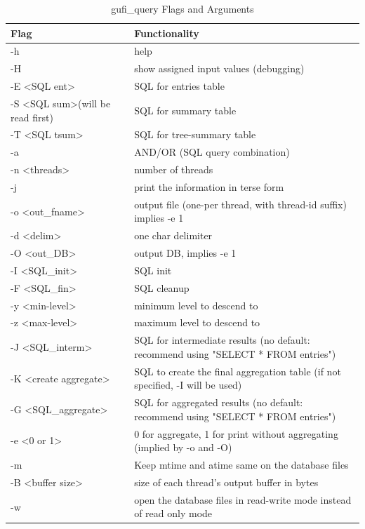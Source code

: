 \begin{table} [h]
\centering
\begin{tabular}{l|p{6cm}}
Flag & Functionality \\\hline
-h & help\\
\hline
-H & show assigned input values (debugging)\\
\hline
-E \textless SQL ent\textgreater & SQL for entries table \\
\hline
-S \textless SQL sum\textgreater (will be read first) & SQL for summary table\\
\hline
-T \textless SQL tsum\textgreater & SQL for tree-summary table\\
\hline
-a & AND/OR (SQL query combination)\\
\hline
-n \textless threads\textgreater & number of threads\\
\hline
-j & print the information in terse form\\
\hline
-o \textless out\_fname\textgreater & output file (one-per thread, with thread-id suffix) implies -e 1\\
\hline
-d \textless delim\textgreater & one char delimiter \\
\hline
-O \textless out\_DB\textgreater & output DB, implies -e 1 \\
\hline
-I \textless SQL\_init\textgreater & SQL init \\
\hline
-F \textless SQL\_fin\textgreater & SQL cleanup \\
\hline
-y \textless min-level\textgreater & minimum level to descend to \\
\hline
-z \textless max-level\textgreater & maximum level to descend to\\
\hline
-J \textless SQL\_interm\textgreater & SQL for intermediate results (no default: recommend using "SELECT * FROM entries") \\
\hline
-K \textless create aggregate\textgreater & SQL to create the final aggregation table (if not specified, -I will be used)\\
\hline
-G \textless SQL\_aggregate\textgreater & SQL for aggregated results (no default: recommend using "SELECT * FROM entries")\\
\hline
-e \textless 0 or 1\textgreater & 0 for aggregate, 1 for print without aggregating (implied by -o and -O)\\
\hline
-m & Keep mtime and atime same on the database files \\
\hline
-B \textless buffer size\textgreater & size of each thread's output buffer in bytes \\
\hline
-w & open the database files in read-write mode instead of read only mode
\end{tabular}
\caption{\label{tab:widgets}gufi\_query Flags and Arguments}
\end{table}

